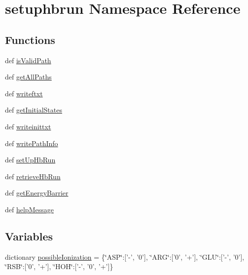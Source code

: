 \hypertarget{namespacesetuphbrun}{\section{setuphbrun Namespace Reference}
\label{namespacesetuphbrun}
}
\subsection*{Functions}
\begin{DoxyCompactItemize}
\item 
def \hyperlink{namespacesetuphbrun_ae9abf2127d06013b804b1ab0b7228265}{is\-Valid\-Path}
\item 
def \hyperlink{namespacesetuphbrun_a4419dec9c407e335abe313ee39bec038}{get\-All\-Paths}
\item 
def \hyperlink{namespacesetuphbrun_a7d336d4116cbb970a58f17e460985bf4}{writeftxt}
\item 
def \hyperlink{namespacesetuphbrun_ac9b42e8a808ba976ce73e4324495423a}{get\-Initial\-States}
\item 
def \hyperlink{namespacesetuphbrun_a0b63b436ff0def945047f852e0d6bbe9}{writeinittxt}
\item 
def \hyperlink{namespacesetuphbrun_ae1525e41d76a8f0131ccb5544f864a21}{write\-Path\-Info}
\item 
def \hyperlink{namespacesetuphbrun_a5ca3466e3cb738c1e0f0136410200bf2}{set\-Up\-Hb\-Run}
\item 
def \hyperlink{namespacesetuphbrun_a010268afa6ba545417ade40d0a54b62d}{retrieve\-Hb\-Run}
\item 
def \hyperlink{namespacesetuphbrun_ad068a72269e18c98fcebab3a3f594909}{get\-Energy\-Barrier}
\item 
def \hyperlink{namespacesetuphbrun_ae5a3b540d5b67d24d5341d868d1a4f21}{help\-Message}
\end{DoxyCompactItemize}
\subsection*{Variables}
\begin{DoxyCompactItemize}
\item 
dictionary \hyperlink{namespacesetuphbrun_ad54c2db37c70cfe5b861d0f0c8fff666}{possible\-Ionization} = \{\char`\"{}A\-S\-P\char`\"{}\-:\mbox{[}'-\/', '0'\mbox{]}, \char`\"{}A\-R\-G\char`\"{}\-:\mbox{[}'0', '+'\mbox{]}, \char`\"{}G\-L\-U\char`\"{}\-:\mbox{[}'-\/', '0'\mbox{]}, \char`\"{}R\-S\-B\char`\"{}\-:\mbox{[}'0', '+'\mbox{]}, \char`\"{}H\-O\-H\char`\"{}\-:\mbox{[}'-\/', '0', '+'\mbox{]}\}
\end{DoxyCompactItemize}


